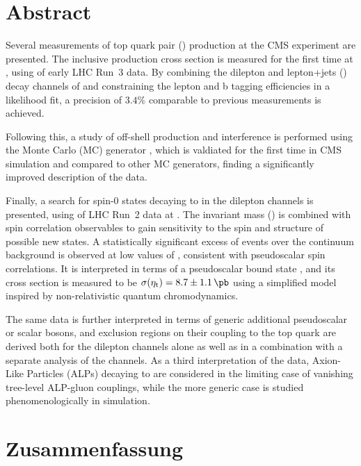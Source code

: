 \cleardoublepage %
\chapter*{Abstract}

Several measurements of top quark pair (\ttbar) production at the CMS experiment are presented. The inclusive \ttbar production cross section \sigmatt is measured for the first time at \sqrtsRIII, using \lumiRIII of early LHC Run~3 data. By combining the dilepton and lepton+jets (\ljets) decay channels of \ttbar and constraining the lepton and b tagging efficiencies in a likelihood fit, a precision of $3.4\%$ comparable to previous \sigmatt measurements is achieved.

Following this, a study of off-shell \ttbar production and \tttW interference is performed using the Monte Carlo (MC) generator \bbfourl, which is valdiated for the first time in CMS simulation and compared to other MC generators, finding a significantly improved description of the data.

Finally, a search for spin-0 states decaying to \ttbar in the dilepton channels is presented, using \lumiRII of LHC Run~2 data at \sqrtsRII. The invariant \ttbar mass (\mtt) is combined with spin correlation observables to gain sensitivity to the spin and \CP structure of possible new states. A statistically significant excess of events over the \ttbar continuum background is observed at low values of \mtt, consistent with pseudoscalar spin correlations. It is interpreted in terms of a pseudoscalar \ttbar bound state \etat, and its cross section is measured to be $\sigetat =  8.7 \pm 1.1  \, \si{\pb}$ using a simplified model inspired by non-relativistic quantum chromodynamics. 

The same data is further interpreted in terms of generic additional pseudoscalar or scalar bosons, and exclusion regions on their coupling to the top quark are derived both for the dilepton channels alone as well as in a combination with a separate analysis of the \ljets channels. As a third interpretation of the data, Axion-Like Particles (ALPs) decaying to \ttbar are considered in the limiting case of vanishing tree-level ALP-gluon couplings, while the more generic case is studied phenomenologically in simulation.

\cleardoublepage %
\chapter*{Zusammenfassung}

